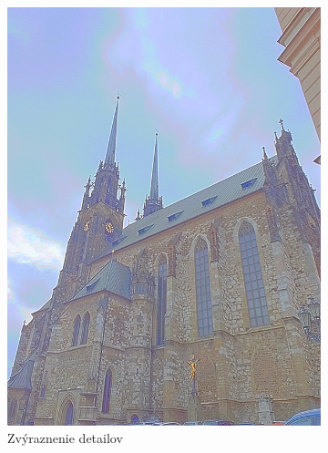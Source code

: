 \begin{figure}[h!]
\begin{subfigure}{0.3\textwidth}
      \includegraphics[width=\textwidth]{figures/tests/tmo/durSpace2}
      \caption{Zvýraznenie detailov}
  \end{subfigure}
  ~
  \begin{subfigure}{0.3\textwidth}

\end{subfigure}
\end{figure}
